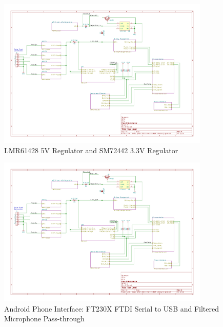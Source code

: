 \documentclass{article}
\numberwithin{figure}{section}
\numberwithin{equation}{section}
\begin{document}
{\begin{figure}[H]
	\centering
	\includegraphics[page=6,width=0.9\textwidth]{RFCxSchematics.pdf}
	\caption{LMR61428 5V Regulator and SM72442 3.3V Regulator}
	\label{fig:schemp6}
\end{figure}

\begin{figure}[H]
	\centering
	\includegraphics[page=7,width=0.9\textwidth]{RFCxSchematics.pdf}
	\caption{Android Phone Interface: FT230X FTDI Serial to USB and Filtered Microphone Pass-through}
	\label{fig:schemp7}
\end{figure}


%
%

}
\end{document}

